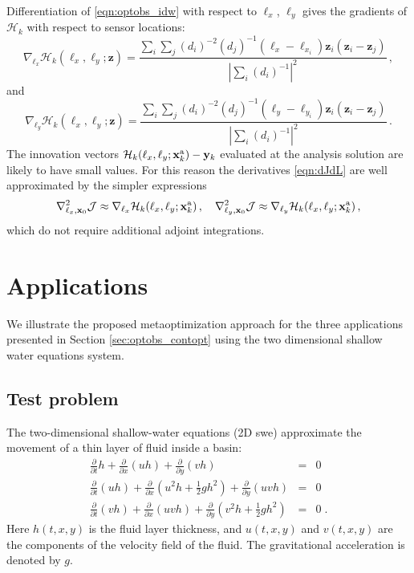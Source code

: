 \documentclass{article}
\newcommand{\Jfunc}{\mathcal J }
\newcommand{\Hobs}{\mathcal{H}}
\newcommand{\x}{   \mathbf{x} }
\newcommand{\xa}{ \mathbf{x}^{\rm a} }
\newcommand{\y}{ \mathbf{y} }
\newcommand{\z}{ \mathbf{z} }
\renewcommand{\H}{\mathcal{H}}
\begin{document}
Differentiation of \eqref{eqn:optobs_idw} with respect to $\ell_x$, $\ell_y$ gives the gradients of $\H_k$ with respect to sensor locations:
\[
 \nabla_{\ell_x} \H_k(\ell_x, \ell_y; \z) = \frac{\sum\limits_i \sum\limits_j (d_i)^{-2} (d_j)^{-1} \left(\ell_x - \ell_{x_i}\right) \z_i \left( \z_i - \z_j \right)}{ \left| \sum\limits_i (d_i)^{-1} \right|^2 }\,,
\]
and
\[
 \nabla_{\ell_y} \H_k(\ell_x, \ell_y; \z) = \frac{\sum\limits_i \sum\limits_j (d_i)^{-2} (d_j)^{-1} \left(\ell_y - \ell_{y_i}\right) \z_i \left( \z_i - \z_j \right)}{ \left| \sum\limits_i (d_i)^{-1} \right|^2 }\,.
\]
The innovation vectors $\Hobs_k(\ell_x,\ell_y; \xa_k) - \y_k $ evaluated at the analysis solution are likely to have small values.
For this reason the derivatives \eqref{eqn:dJdL} are well approximated by the simpler expressions
\begin{equation}
\label{eqn:dJdL-approximate}
\nabla_{\ell_x,\x_0}^2 \Jfunc \approx \nabla_{\ell_x} \H_k(\ell_x,\ell_y; \xa_k)\,, \quad
\nabla_{\ell_y,\x_0}^2 \Jfunc \approx \nabla_{\ell_y} \H_k(\ell_x,\ell_y; \xa_k)\,, 
\end{equation}
which do not require additional adjoint integrations.

\section{Applications}\label{sec:optobs_appl}


We illustrate the proposed metaoptimization approach for 
the three applications presented in Section \ref{sec:optobs_contopt} using the
two dimensional shallow water equations system.

\subsection{Test problem}


The two-dimensional shallow-water equations (2D {\sc swe})  \cite{CPA:CPA3160210103} approximate the movement of a thin layer of fluid inside a basin:
\begin{eqnarray}
 \frac{\partial}{\partial t} h + \frac{\partial}{\partial x} (uh) + \frac{\partial}{\partial y} (vh) &=& 0 \nonumber \\
 \frac{\partial}{\partial t} (uh) + \frac{\partial}{\partial x} \left(u^2 h + \frac{1}{2} g h^2\right) + \frac{\partial}{\partial y} (u v h) &=& 0  \label{swe} \\
 \frac{\partial}{\partial t} (vh) + \frac{\partial}{\partial x} (u v h) + \frac{\partial}{\partial y} \left(v^2 h + \frac{1}{2} g h^2\right) &=& 0 \;.
\nonumber
\end{eqnarray}
Here $h(t,x,y)$ is the fluid layer thickness, and $u(t,x,y)$ and $v(t,x,y)$ are the components of 
the velocity field of the fluid. The gravitational acceleration is denoted by $g$. 
\end{document}
